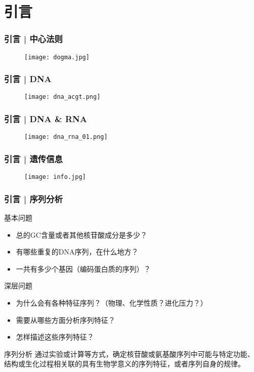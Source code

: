 \section{引言}

\begin{frame}
  \frametitle{引言 | 中心法则}
  \begin{figure}
    \centering
    \texttt{[image: dogma.jpg]}
  \end{figure}
\end{frame}

\begin{frame}
  \frametitle{引言 | DNA}
  \begin{figure}
    \centering
    \texttt{[image: dna\_acgt.png]}
  \end{figure}
\end{frame}

\begin{frame}
  \frametitle{引言 | DNA \& RNA}
  \begin{figure}
    \centering
    \texttt{[image: dna\_rna\_01.png]}
  \end{figure}
\end{frame}

\begin{frame}
  \frametitle{引言 | \alert{遗传信息}}
  \begin{figure}
    \centering
    \texttt{[image: info.jpg]}
  \end{figure}
\end{frame}

\begin{frame}
  \frametitle{引言 | 序列分析}
  \begin{block}{基本问题}
    \begin{itemize}
      \item 总的GC含量或者其他核苷酸成分是多少？
      \item 有哪些重复的DNA序列，在什么地方？
      \item 一共有多少个基因（编码蛋白质的序列）？
    \end{itemize}
  \end{block}
  \vspace{-0.3em}
  \pause
  \begin{block}{深层问题}
    \begin{itemize}
      \item 为什么会有各种特征序列？（物理、化学性质？进化压力？）
      \item 需要从哪些方面分析序列特征？
      \item 怎样描述这些序列特征？
    \end{itemize}
  \end{block}
  \vspace{-0.3em}
  \pause
  \begin{block}{序列分析}
    通过实验或计算等方式，确定核苷酸或氨基酸序列中可能与特定功能、结构或生化过程相关联的\alert{具有生物学意义的序列特征}，或者\alert{序列自身的规律}。
  \end{block}
\end{frame}


